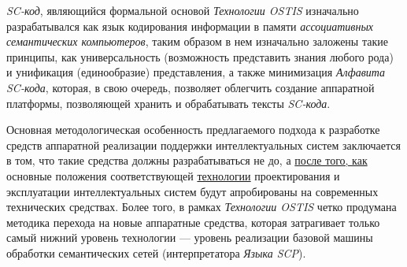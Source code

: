 \textit{SC-код}, являющийся формальной основой \textit{Технологии OSTIS} изначально разрабатывался как язык кодирования информации в памяти \textit{ассоциативных семантических компьютеров}, таким образом в нем изначально заложены такие принципы, как универсальность (возможность представить знания любого рода) и унификация (единообразие) представления, а также минимизация \textit{Алфавита SC-кода}, которая, в свою очередь, позволяет облегчить создание аппаратной платформы, позволяющей хранить и обрабатывать тексты \textit{SC-кода}.

Основная методологическая особенность предлагаемого подхода к разработке средств аппаратной реализации поддержки интеллектуальных систем заключается в том, что такие средства должны разрабатываться не до, а \underline{после того, как} основные положения соответствующей \underline{технологии} проектирования и эксплуатации интеллектуальных систем будут апробированы на современных технических средствах. Более того, в рамках \textit{\textit{Технологии OSTIS}} четко продумана методика перехода на новые аппаратные средства, которая затрагивает только самый нижний уровень технологии --- уровень реализации базовой машины обработки семантических сетей (интерпретатора \textit{Языка SCP}).

